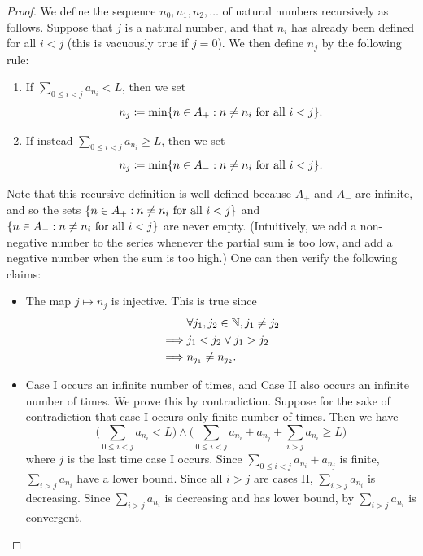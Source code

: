 \begin{proof}
  We define the sequence \(n_0, n_1, n_2, \dots\) of natural numbers recursively as follows.
  Suppose that \(j\) is a natural number, and that \(n_i\) has already been defined for all \(i < j\) (this is vacuously true if \(j = 0\)).
  We then define \(n_j\) by the following rule:
  \begin{enumerate}[label=(\Roman*)]
    \item If \(\sum_{0 \leq i < j} a_{n_i} < L\), then we set
          \[
            n_j \coloneqq \min\set{n \in A_+ : n \neq n_i \text{ for all } i < j}.
          \]
    \item If instead \(\sum_{0 \leq i < j} a_{n_i} \geq L\), then we set
          \[
            n_j \coloneqq \min\set{n \in A_- : n \neq n_i \text{ for all } i < j}.
          \]
  \end{enumerate}
  Note that this recursive definition is well-defined because \(A_+\) and \(A_-\) are infinite, and so the sets \(\left\lbrace n \in A_+ : n \neq n_i \text{ for all } i < j\right\rbrace\) and \(\left\lbrace n \in A_- : n \neq n_i \text{ for all } i < j\right\rbrace\) are never empty.
  (Intuitively, we add a non-negative number to the series whenever the partial sum is too low, and add a negative number when the sum is too high.)
  One can then verify the following claims:
  \begin{itemize}
    \item The map \(j \mapsto n_j\) is injective.
          This is true since
          \begin{align*}
                     & \forall j_1, j_2 \in \mathbb{N}, j_1 \neq j_2 \\
            \implies & j_1 < j_2 \lor j_1 > j_2              \\
            \implies & n_{j_1} \neq n_{j_2}.
          \end{align*}
    \item Case I occurs an infinite number of times, and Case II also occurs an infinite number of times.
          We prove this by contradiction.
          Suppose for the sake of contradiction that case I occurs only finite number of times.
          Then we have
          \[
            \Bigg(\sum_{0 \leq i < j} a_{n_i} < L\Bigg) \land \Bigg(\sum_{0 \leq i < j} a_{n_i} + a_{n_j} + \sum_{i > j} a_{n_i} \geq L\Bigg)
          \]
          where \(j\) is the last time case I occurs.
          Since \(\sum_{0 \leq i < j} a_{n_i} + a_{n_j}\) is finite, \(\sum_{i > j} a_{n_i}\) have a lower bound.
          Since all \(i > j\) are cases II, \(\sum_{i > j} a_{n_i}\) is decreasing.
          Since \(\sum_{i > j} a_{n_i}\) is decreasing and has lower bound, by  \(\sum_{i > j} a_{n_i}\) is convergent.

\end{itemize}
\end{proof}
